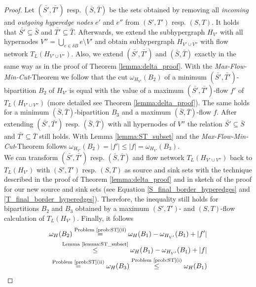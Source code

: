 \begin{proof}
Let $(\bar{S'},\bar{T'})$ resp. $(\bar{S},\bar{T})$ be the sets obtained by removing all
\emph{incoming} and \emph{outgoing hyperedge nodes} $e'$ and $e''$ from $(S',T')$ resp.
$(S,T)$. It holds that $\bar{S'} \subseteq \bar{S}$ and $\bar{T'} \subseteq \bar{T}$. Afterwards,
we extend the subhypergraph $H_{V'}$ with all hypernodes $V'' = \bigcup_{e \in \delta B} e \setminus V'$
and obtain subhypergraph $H_{V' \cup V''}$ with flow network $T_L(H_{V' \cup V''})$.
Also, we extend $(\bar{S'},\bar{T'})$ and $(\bar{S},\bar{T})$ exactly in the same way as 
in the proof of Theorem \ref{lemma:delta_proof}. With the \emph{Max-Flow-Min-Cut}-Theorem 
\cite{ford1956maximal} we follow that the cut $\omega_{H_{V'}}(B_2)$ of 
a minimum $(\bar{S'},\bar{T'})$-bipartition $B_2$ of $H_{V'}$ is equal with the value of a 
maximum $(\bar{S'},\bar{T'})$-flow $f'$ of $T_L(H_{V' \cup V''})$ (more detailed see Theorem \ref{lemma:delta_proof}). 
The same holds for a minimum $(\bar{S},\bar{T})$-bipartition
$B_3$ and a maximum $(\bar{S},\bar{T})$-flow $f$. After extending $(\bar{S'},\bar{T'})$ 
resp. $(\bar{S},\bar{T})$ with all hypernodes of $V''$ the relation $\bar{S'} \subseteq \bar{S}$
and $\bar{T'} \subseteq \bar{T}$ still holds. With Lemma \ref{lemma:ST_subset} and the 
\emph{Max-Flow-Min-Cut}-Theorem follows $\omega_{H_{V'}}(B_2) = |f'| \le |f| = \omega_{H_{V'}}(B_3)$.\\
We can transform $(\bar{S'},\bar{T'})$ resp. $(\bar{S},\bar{T})$ and flow network $T_L(H_{V'\cup V''})$
back to $T_L(H_{V'})$ with $(S',T')$ resp. $(S,T)$ as source and sink sets
with the technique described in the proof of Theorem \ref{lemma:delta_proof} and in sketch
of the proof for our new source and sink sets (see Equation \ref{S_final_border_hyperedges} and
\ref{T_final_border_hyperedges}). Therefore, the inequality still holds for bipartitions
$B_2$ and $B_3$ obtained by a maximum $(S',T')$- and $(S,T)$-flow calculation of $T_L(H_{V'})$.
Finally, it follows
\begin{align*}
\omega_H(B_2) \stackrel{\text{Problem \ref{prob:ST}(ii)}}{=} 
\omega_H(B_1) - \omega_{H_{V'}}(B_1) + |f'| \\
\stackrel{\text{Lemma \ref{lemma:ST_subset}}}{\le} \omega_H(B_1) - \omega_{H_{V'}}(B_1) + |f| \\
\stackrel{\text{Problem \ref{prob:ST}(ii)}}{=} \omega_H(B_3) \stackrel{\text{Problem \ref{prob:ST}(i)}}{\le} \omega_H(B_1)
\end{align*}
\end{proof}

